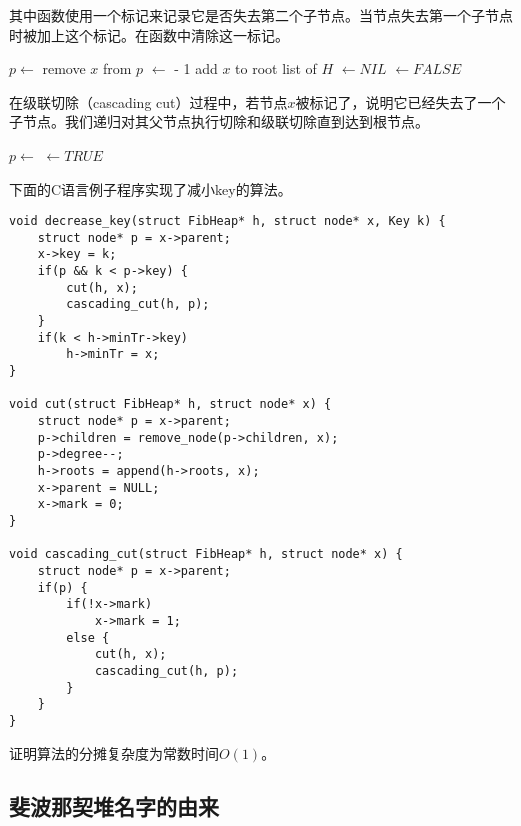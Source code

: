 \documentclass{ctexart}
\begin{document}
其中函数使用一个标记来记录它是否失去第二个子节点。当节点失去第一个子节点时被加上这个标记。在函数中清除这一标记。

\begin{algorithmic}[1]
  \State $p \gets $ 
  \State remove $x$ from $p$
  \State {} $\gets$  - 1
  \State add $x$ to root list of $H$
  \State {} $\gets NIL$
  \State {} $\gets FALSE$
\EndFunction
\end{algorithmic}

在级联切除（cascading cut）过程中，若节点$x$被标记了，说明它已经失去了一个子节点。我们递归对其父节点执行切除和级联切除直到达到根节点。

\begin{algorithmic}[1]
  \State $p \gets $ 
      \State {} $\gets TRUE$
    \Else
      \State {}
      \State {}
    \EndIf
  \EndIf
\EndFunction
\end{algorithmic}

下面的C语言例子程序实现了减小key的算法。

\lstset{language=C}
\begin{lstlisting}
void decrease_key(struct FibHeap* h, struct node* x, Key k) {
    struct node* p = x->parent;
    x->key = k;
    if(p && k < p->key) {
        cut(h, x);
        cascading_cut(h, p);
    }
    if(k < h->minTr->key)
        h->minTr = x;
}

void cut(struct FibHeap* h, struct node* x) {
    struct node* p = x->parent;
    p->children = remove_node(p->children, x);
    p->degree--;
    h->roots = append(h->roots, x);
    x->parent = NULL;
    x->mark = 0;
}

void cascading_cut(struct FibHeap* h, struct node* x) {
    struct node* p = x->parent;
    if(p) {
        if(!x->mark)
            x->mark = 1;
        else {
            cut(h, x);
            cascading_cut(h, p);
        }
    }
}
\end{lstlisting}

\begin{Exercise}
证明算法的分摊复杂度为常数时间$O(1)$。
\end{Exercise}

\subsection{斐波那契堆名字的由来}
\end{document}
